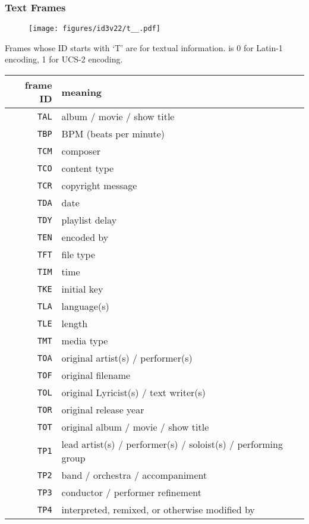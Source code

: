 \clearpage

\subsubsection{Text Frames}
\begin{figure}[h]
\texttt{[image: figures/id3v22/t\_\_.pdf]}
\end{figure}
\par
\noindent
Frames whose ID starts with `T' are for textual information.
 is 0 for Latin-1 encoding, 1 for UCS-2 encoding.
\par
\noindent
{
\begin{tabular}{r|l}
frame ID & meaning \\
\hline
\texttt{TAL} & album / movie / show title \\
\texttt{TBP} & BPM (beats per minute) \\
\texttt{TCM} & composer \\
\texttt{TCO} & content type \\
\texttt{TCR} & copyright message \\
\texttt{TDA} & date \\
\texttt{TDY} & playlist delay \\
\texttt{TEN} & encoded by \\
\texttt{TFT} & file type \\
\texttt{TIM} & time \\
\texttt{TKE} & initial key \\
\texttt{TLA} & language(s) \\
\texttt{TLE} & length \\
\texttt{TMT} & media type \\
\texttt{TOA} & original artist(s) / performer(s) \\
\texttt{TOF} & original filename \\
\texttt{TOL} & original Lyricist(s) / text writer(s) \\
\texttt{TOR} & original release year \\
\texttt{TOT} & original album / movie / show title \\
\texttt{TP1} & lead artist(s) / performer(s) / soloist(s) / performing group \\
\texttt{TP2} & band / orchestra / accompaniment \\
\texttt{TP3} & conductor / performer refinement \\
\texttt{TP4} & interpreted, remixed, or otherwise modified by \\

\end{tabular}}
